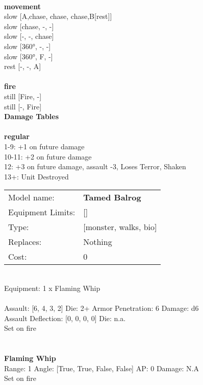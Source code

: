 \ \\ {\bf movement } \\
slow [A,chase, chase, chase,B[rest]] \\
slow [chase, -, -] \\
slow [-, -, chase] \\
slow [360°, -, -] \\
slow [360°, F, -] \\
rest [-, -, A] \\
\ \\ {\bf fire } \\
still [Fire, -] \\
still [-, Fire] \\


{\bf Damage Tables} \\
\ \\ {\bf regular } \\
1-9: +1 on future damage \\
10-11: +2 on future damage \\
12: +3 on future damage, assault -3, Loses Terror, Shaken \\
13+: Unit Destroyed \\


\noindent
\begin{tabular}{ll}
Model name: &{\bf Tamed Balrog } \\
Equipment Limits: &[] \\
Type: &[monster, walks, bio] \\
Replaces: &Nothing \\
Cost: & 0\\
\end{tabular}
\ \\
Equipment: 1 x Flaming Whip \\
\ \\
Assault: [6, 4, 3, 2] Die: 2+ Armor Penetration: 6 Damage: d6 \\
Assault Deflection: [0, 0, 0, 0] Die: n.a.\\
\indent Set on fire\\ 
 
\ \\

\ \\
{\bf Flaming Whip } \\



Range: 1  Angle: [True, True, False, False] AP: 0 Damage: N.A \\
Set on fire\\ 




